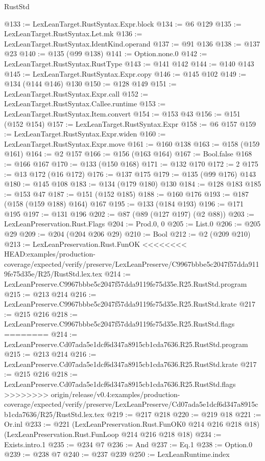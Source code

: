 \begin{lexlean}{RustStd}
\begin{coremodule}
{\begin{coremodule}
{{{{{@133 := LexLeanTarget.RustSyntax.Expr.block
@134 := @6 @129
@135 := LexLeanTarget.RustSyntax.Let.mk
@136 := LexLeanTarget.RustSyntax.IdentKind.operand
@137 := @91 @136
@138 := @137 @23
@140 := @135 (@99 @138)
@141 := Option.none.{0}
@142 := LexLeanTarget.RustSyntax.RustType
@143 := @141 @142
@144 := @140 @143
@145 := LexLeanTarget.RustSyntax.Expr.copy
@146 := @145 @102
@149 := @134 (@144 @146) @130
@150 := @128 @149
@151 := LexLeanTarget.RustSyntax.Expr.call
@152 := LexLeanTarget.RustSyntax.Callee.runtime
@153 := LexLeanTarget.RustSyntax.Item.convert
@154 := @153 @43
@156 := @151 (@152 @154)
@157 := LexLeanTarget.RustSyntax.Expr
@158 := @6 @157
@159 := LexLeanTarget.RustSyntax.Expr.widen
@160 := LexLeanTarget.RustSyntax.Expr.move
@161 := @160 @138
@163 := @158 (@159 @161)
@164 := @2 @157
@166 := @156 (@163 @164)
@167 := Bool.false
@168 := @166 @167
@170 := @133 (@150 @168)
@171 := @132 @170
@172 := 2
@175 := @13 @172 (@16 @172)
@176 := @137 @175
@179 := @135 (@99 @176) @143
@180 := @145 @108
@183 := @134 (@179 @180) @130
@184 := @128 @183
@185 := @153 @47
@187 := @151 (@152 @185)
@188 := @160 @176
@193 := @187 (@158 (@159 @188) @164) @167
@195 := @133 (@184 @193)
@196 := @171 @195
@197 := @131 @196
@202 := @87 (@89 (@127 @197) (@2 @88))
@203 := LexLeanPreservation.Rust.Flags
@204 := Prod.{0, 0}
@205 := List.{0}
@206 := @205 @29
@209 := @204 (@204 @206 @29)
@210 := Bool
@212 := @2 (@209 @210)
@213 := LexLeanPreservation.Rust.FunOK
<<<<<<<< HEAD:examples/production-coverage/expected/verify/preserve/LexLeanPreserve/C9967bbbe5c2047f57dda9119fe75d35e/R25/RustStd.lex.tex
@214 := LexLeanPreserve.C9967bbbe5c2047f57dda9119fe75d35e.R25.RustStd.program
@215 := @213 @214
@216 := LexLeanPreserve.C9967bbbe5c2047f57dda9119fe75d35e.R25.RustStd.krate
@217 := @215 @216
@218 := LexLeanPreserve.C9967bbbe5c2047f57dda9119fe75d35e.R25.RustStd.flags
========
@214 := LexLeanPreserve.Cd07ada5e1dcf6d347a8915cb1cda7636.R25.RustStd.program
@215 := @213 @214
@216 := LexLeanPreserve.Cd07ada5e1dcf6d347a8915cb1cda7636.R25.RustStd.krate
@217 := @215 @216
@218 := LexLeanPreserve.Cd07ada5e1dcf6d347a8915cb1cda7636.R25.RustStd.flags
>>>>>>>> origin/release/v0.4:examples/production-coverage/expected/verify/preserve/LexLeanPreserve/Cd07ada5e1dcf6d347a8915cb1cda7636/R25/RustStd.lex.tex
@219 := @217 @218
@220 := @219 @18
@221 := Or.inl
@233 := @221
    (LexLeanPreservation.Rust.FunOK0 @214 @216 @218 @18)
    (LexLeanPreservation.Rust.FunLoop @214 @216 @218 @18)
@234 := Exists.intro.{1}
@235 := @234 @7
@236 := And
@237 := Eq.{1}
@238 := Option.{0}
@239 := @238 @7
@240 := @237 @239
@250 := LexLeanRuntime.index
}}}}}
\end{coremodule}}
\end{coremodule}
\end{lexlean}
